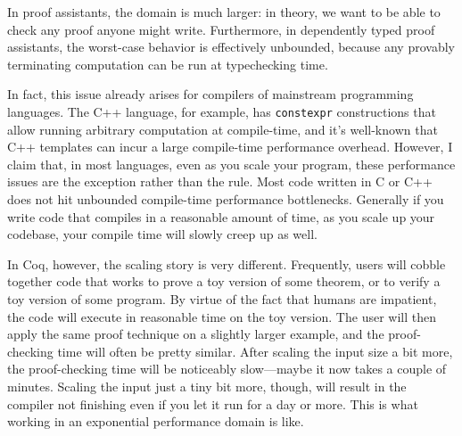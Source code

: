 In proof assistants, the domain is much larger: in theory, we want to be able to check any proof anyone might write.
Furthermore, in dependently typed proof assistants, the worst-case behavior is effectively unbounded, because any provably terminating computation can be run at typechecking time.

In fact, this issue already arises for compilers of mainstream programming languages.
The C++ language, for example, has \texttt{constexpr} constructions that allow running arbitrary computation at compile-time, and it's well-known that C++ templates can incur a large compile-time performance overhead.
However, I claim that, in most languages, even as you scale your program, these performance issues are the exception rather than the rule.
Most code written in C or C++ does not hit unbounded compile-time performance bottlenecks.
Generally if you write code that compiles in a reasonable amount of time, as you scale up your codebase, your compile time will slowly creep up as well.

In Coq, however, the scaling story is very different.
Frequently, users will cobble together code that works to prove a toy version of some theorem, or to verify a toy version of some program.
By virtue of the fact that humans are impatient, the code will execute in reasonable time on the toy version.
The user will then apply the same proof technique on a slightly larger example, and the proof-checking time will often be pretty similar.
After scaling the input size a bit more, the proof-checking time will be noticeably slow---maybe it now takes a couple of minutes.
Scaling the input just a tiny bit more, though, will result in the compiler not finishing even if you let it run for a day or more.
This is what working in an exponential performance domain is like.

